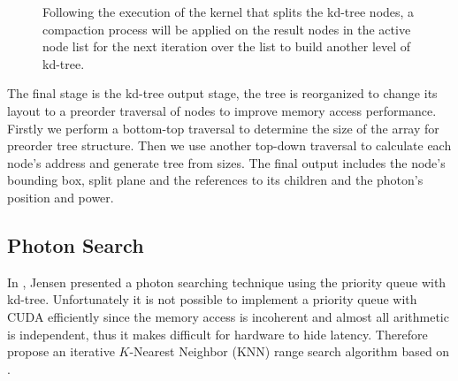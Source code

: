 \begin{figure}[ftp]
    \centering
    \renewcommand{\thefigure}{\thechapter.\arabic{figure}}
    \caption[Compacting kd-tree nodes in the active node list for next iteration.]{Following the execution of the kernel that splits the kd-tree nodes, a compaction process will be applied on the result nodes in the active node list for the next iteration over the list to build another level of kd-tree.}
    \label{fig:compact_active_list}
\end{figure}

The final stage is the kd-tree output stage, the tree is reorganized to change its layout to a preorder traversal of nodes to improve memory access performance. Firstly we perform a bottom-top traversal to determine the size of the array for preorder tree structure. Then we use another top-down traversal to calculate each node's address and generate tree from sizes. The final output includes the node's bounding box, split plane and the references to its children and the photon's position and power.

\subsection{Photon Search}
In \cite{HenrikWannJensen2004}, Jensen presented a photon searching technique using the priority queue with kd-tree. Unfortunately it is not possible to implement a priority queue with CUDA efficiently since the memory access is incoherent and almost all arithmetic is independent, thus it makes difficult for hardware to hide latency. Therefore \citeauthor{Zhou2008} propose an iterative $K$-Nearest Neighbor (KNN) range search algorithm based on \cite{Preparata:1985:CGI:4333}.

